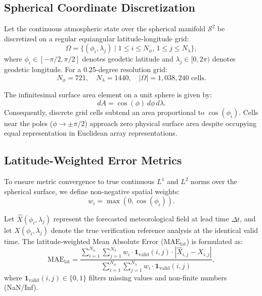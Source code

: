 \documentclass[10pt,journal,compsoc]{IEEEtran}
\begin{document}
\subsection{Spherical Coordinate Discretization}
Let the continuous atmospheric state over the spherical manifold $\mathcal{S}^2$ be discretized on a regular equiangular latitude-longitude grid:
\begin{equation}
    \Omega = \{ (\phi_i, \lambda_j) \mid 1 \leq i \leq N_\phi, \, 1 \leq j \leq N_\lambda \},
\end{equation}
where $\phi_i \in [-\pi/2, \pi/2]$ denotes geodetic latitude and $\lambda_j \in [0, 2\pi)$ denotes geodetic longitude. For a 0.25-degree resolution grid:
\begin{equation}
    N_\phi = 721, \quad N_\lambda = 1440, \quad |\Omega| = 1,038,240 \text{ cells}.
\end{equation}

The infinitesimal surface area element on a unit sphere is given by:
\begin{equation}
    dA = \cos(\phi) \, d\phi \, d\lambda.
\end{equation}
Consequently, discrete grid cells subtend an area proportional to $\cos(\phi_i)$. Cells near the poles ($\phi \to \pm \pi/2$) approach zero physical surface area despite occupying equal representation in Euclidean array representations.

\subsection{Latitude-Weighted Error Metrics}
To ensure metric convergence to true continuous $L^1$ and $L^2$ norms over the spherical surface, we define non-negative spatial weights:
\begin{equation}
    w_i = \max(0, \cos(\phi_i)).
\end{equation}

Let $\hat{X}(\phi_i, \lambda_j)$ represent the forecasted meteorological field at lead time $\Delta t$, and let $X(\phi_i, \lambda_j)$ denote the true verification reference analysis at the identical valid time. The latitude-weighted Mean Absolute Error ($\text{MAE}_{\text{lat}}$) is formulated as:
\begin{equation}
    \text{MAE}_{\text{lat}} = \frac{\sum_{i=1}^{N_\phi} \sum_{j=1}^{N_\lambda} w_i \cdot \mathbf{1}_{\text{valid}}(i,j) \cdot |\hat{X}_{i,j} - X_{i,j}|}{\sum_{i=1}^{N_\phi} \sum_{j=1}^{N_\lambda} w_i \cdot \mathbf{1}_{\text{valid}}(i,j)},
\end{equation}
where $\mathbf{1}_{\text{valid}}(i,j) \in \{0, 1\}$ filters missing values and non-finite numbers (NaN/Inf).
\end{document}
